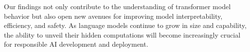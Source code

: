 \documentclass[11pt,a4paper]{article}
\begin{document}
Our findings not only contribute to the understanding of transformer model behavior but also open new avenues for improving model interpretability, efficiency, and safety. As language models continue to grow in size and capability, the ability to unveil their hidden computations will become increasingly crucial for responsible AI development and deployment.



\end{document}
